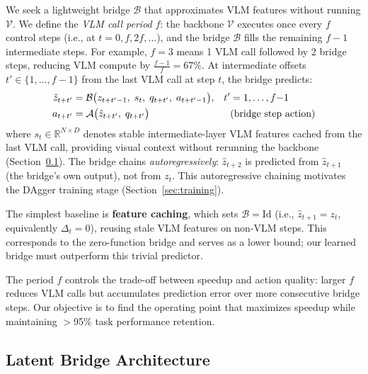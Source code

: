\documentclass{article}
\begin{document}
We seek a lightweight bridge $\mathcal{B}$ that approximates VLM features without running $\mathcal{V}$.
We define the \emph{VLM call period} $f$: the backbone $\mathcal{V}$ executes once every $f$ control steps (i.e., at $t = 0, f, 2f, \ldots$), and the bridge $\mathcal{B}$ fills the remaining $f{-}1$ intermediate steps.
For example, $f{=}3$ means 1 VLM call followed by 2 bridge steps, reducing VLM compute by $\frac{f-1}{f} = 67\%$.
At intermediate offsets $t' \in \{1, \ldots, f{-}1\}$ from the last VLM call at step $t$, the bridge predicts:
\begin{align}
    \hat{z}_{t+t'} &= \mathcal{B}\bigl(z_{t+t'-1},\; s_t,\; q_{t+t'},\; a_{t+t'-1}\bigr), & t' &= 1, \ldots, f{-}1 \label{eq:bridge} \\
    a_{t+t'} &= \mathcal{A}\bigl(\hat{z}_{t+t'},\; q_{t+t'}\bigr) & &\text{(bridge step action)}  \notag
\end{align}
where $s_t \in \mathbb{R}^{N \times D}$ denotes stable intermediate-layer VLM features cached from the last VLM call, providing visual context without rerunning the backbone (Section~\ref{sec:arch}).
The bridge chains \emph{autoregressively}: $\hat{z}_{t+2}$ is predicted from $\hat{z}_{t+1}$ (the bridge's own output), not from $z_t$.
This autoregressive chaining motivates the DAgger training stage (Section~\ref{sec:training}).

The simplest baseline is \textbf{feature caching}, which sets $\mathcal{B} = \text{Id}$ (i.e., $\hat{z}_{t+1} = z_t$, equivalently $\Delta_t = 0$), reusing stale VLM features on non-VLM steps.
This corresponds to the zero-function bridge and serves as a lower bound; our learned bridge must outperform this trivial predictor.

The period $f$ controls the trade-off between speedup and action quality: larger $f$ reduces VLM calls but accumulates prediction error over more consecutive bridge steps.
Our objective is to find the operating point that maximizes speedup while maintaining $>$95\% task performance retention.

\subsection{Latent Bridge Architecture}
\label{sec:arch}
\end{document}
